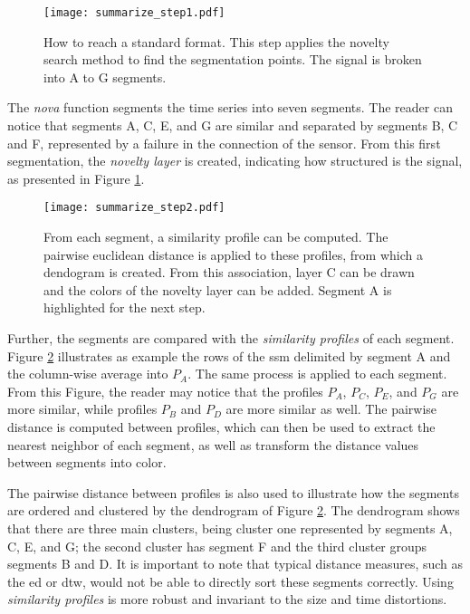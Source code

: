 {\begin{figure}
\centering
\texttt{[image: summarize\_step1.pdf]}
\caption{How to reach a standard format. This step applies the novelty search method to find the segmentation points. The signal is broken into A to G segments.}
\label{fig:summarize_step1}
\end{figure}

The \textit{nova} function segments the time series into seven segments. The reader can notice that segments A, C, E, and G are similar and separated by segments B, C and F, represented by a failure in the connection of the sensor. From this first segmentation, the \textit{novelty layer} is created, indicating how structured is the signal, as presented in Figure \ref{fig:summarize_step1}.

\begin{figure}[b]
\centering
\texttt{[image: summarize\_step2.pdf]}
\caption{From each segment, a similarity profile can be computed. The pairwise euclidean distance is applied to these profiles, from which a dendogram is created. From this association, layer C can be drawn and the colors of the novelty layer can be added. Segment A is highlighted for the next step.}
\label{fig:summarize_step2}
\end{figure}

Further, the segments are compared with the \textit{similarity profiles} of each segment. Figure \ref{fig:summarize_step2} illustrates as example the rows of the \gls{ssm} delimited by segment A and the column-wise average into $P_A$. The same process is applied to each segment. From this Figure, the reader may notice that the profiles $P_A$, $P_C$, $P_E$, and $P_G$ are more similar, while profiles $P_B$ and $P_D$ are more similar as well. The pairwise distance is computed between profiles, which can then be used to extract the nearest neighbor of each segment, as well as transform the distance values between segments into color. 
\par
The pairwise distance between profiles is also used to illustrate how the segments are ordered and clustered by the dendrogram of Figure \ref{fig:summarize_step2}. The dendrogram shows that there are three main clusters, being cluster one represented by segments A, C, E, and G; the second cluster has segment F and the third cluster groups segments B and D. It is important to note that typical distance measures, such as the \gls{ed} or \gls{dtw}, would not be able to directly sort these segments correctly. Using \textit{similarity profiles} is more robust and invariant to the size and time distortions. 

}
